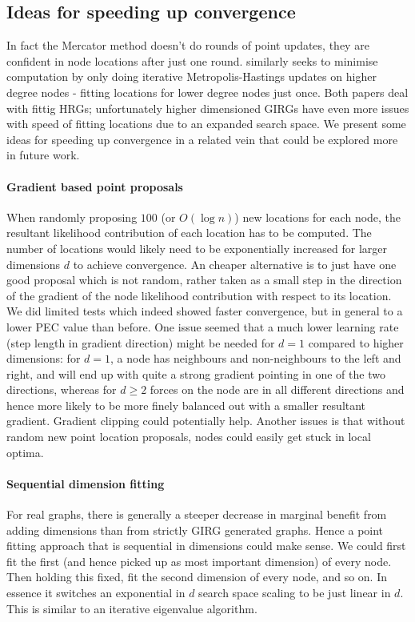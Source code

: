 \subsection{Ideas for speeding up convergence}
In fact the Mercator method doesn't do rounds of point updates, they are confident in node locations after just one round. \cite{boguna2010sustaining} similarly seeks to minimise computation by only doing iterative Metropolis-Hastings updates on higher degree nodes - fitting locations for lower degree nodes just once. Both papers deal with fittig HRGs; unfortunately higher dimensioned GIRGs have even more issues with speed of fitting locations due to an expanded search space. We present some ideas for speeding up convergence in a related vein that could be explored more in future work.

\paragraph{Gradient based point proposals}
When randomly proposing $100$ (or $O(\log n)$) new locations for each node, the resultant likelihood contribution of each location has to be computed. The number of locations would likely need to be exponentially increased for larger dimensions $d$ to achieve convergence.
An cheaper alternative is to just have one good proposal which is not random, rather taken as a small step in the direction of the gradient of the node likelihood contribution with respect to its location.
We did limited tests which indeed showed faster convergence, but in general to a lower PEC value than before. One issue seemed that a much lower learning rate (step length in gradient direction) might be needed for $d=1$ compared to higher dimensions: for $d=1$, a node has neighbours and non-neighbours to the left and right, and will end up with quite a strong gradient pointing in one of the two directions, whereas for $d \geq 2$ forces on the node are in all different directions and hence more likely to be more finely balanced out with a smaller resultant gradient. Gradient clipping could potentially help.
Another issues is that without random new point location proposals, nodes could easily get stuck in local optima.

\paragraph{Sequential dimension fitting}
For real graphs, there is generally a steeper decrease in marginal benefit from adding dimensions than from strictly GIRG generated graphs. Hence a point fitting approach that is sequential in dimensions could make sense. We could first fit the first (and hence picked up as most important dimension) of every node. Then holding this fixed, fit the second dimension of every node, and so on. In essence it switches an exponential in $d$ search space scaling to be just linear in $d$. This is similar to an iterative eigenvalue algorithm.

